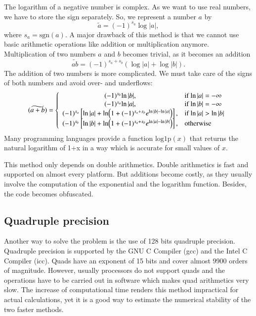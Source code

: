 The logarithm of a negative number is complex. As we want to use real numbers,
we have to store the sign separately. So, we represent a number $a$ by
\begin{equation}
\tilde a = (-1)^{s_a} \log |a|,
\end{equation}
where $s_a = \text{sgn}(a)$.
A major drawback of this method is that we cannot use basic arithmetic
operations like addition or multiplication anymore. Multiplication
of two numbers $a$ and $b$ becomes trivial, as it becomes an addition
\begin{equation}
\widetilde{ab} = (-1)^{s_a+s_b} \left( \log|a| + \log|b|\right).
\end{equation}
The addition of two numbers is more complicated. We must take
care of the signs of both numbers and avoid over- and underflows:
\begin{equation}
\widetilde{(a+b)} =  \left\{
    \begin{array}{cl}
        (-1)^{s_b} \text{ln} \, |b|,                                                                               & \mbox{if } \text{ln} \, |a| = -\infty \\ 
        (-1)^{s_a} \text{ln} \, |a|,                                                                               & \mbox{if } \text{ln} \, |b| = -\infty \\ 
        (-1)^{s_a} \left[\text{ln} \, |a| + \text{ln}{\left(1+(-1)^{s_a+s_b}e^{\text{ln}\, |b|-\text{ln}\, |a|}\right)}\right], & \mbox{if } \text{ln} \, |a| > \text{ln} \, |b| \\ 
        (-1)^{s_b} \left[\text{ln} \, |b| + \text{ln}{\left(1+(-1)^{s_a+s_b}e^{\text{ln}\, |a|-\text{ln}\, |b|}\right)}\right], & \mbox{otherwise}
    \end{array}
\right.
\end{equation}
Many programming languages provide a function $\text{log1p}(x)$ that returns
the natural logarithm of 1+x in a way which is accurate for small values of $x$.

This method only depends on double arithmetics. Double arithmetics is fast and
supported on almost every platform. But additions
become costly, as they usually involve the computation of the exponential and
the logarithm function. Besides, the code becomes obfuscated.


\subsection{Quadruple precision}

Another way to solve the problem is the use of 128 bits quadruple precision.
Quadruple precision is supported by the GNU C Compiler (gcc) and the Intel C
Compiler (icc). Quads have an exponent of 15 bits and cover almost 9900 orders
of magnitude. However, usually processors do not support quads and the
operations have to be carried out in software which makes quad arithmetics very
slow.  The increase of computational time renders this method impractical for
actual calculations, yet it is a good way to estimate the numerical stability
of the two faster methods.


